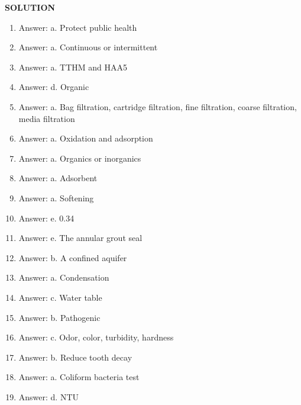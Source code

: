 \documentclass[10pt]{article}
\begin{document}
\newpage

\begin{center}
\textbf{\LARGE{SOLUTION}}
\end{center}

  \begin{enumerate}


  \item Answer: a.  Protect public health
  
  \item Answer: a.  Continuous or intermittent

  \item Answer: a.  TTHM and HAA5
  
  \item Answer: d.  Organic

  \item Answer: a.  Bag filtration, cartridge filtration, fine filtration, coarse filtration, media filtration
  
  \item Answer: a.  Oxidation and adsorption

  \item Answer: a.  Organics or inorganics
  
  \item Answer: a.  Adsorbent
  
  \item Answer: a.  Softening

  \item Answer: e.  0.34%
  
  \item Answer: e.  The annular grout seal

  \item Answer: b.  A confined aquifer

  \item Answer: a.  Condensation

  \item Answer: c.  Water table
  
  \item Answer: b.  Pathogenic
  
  \item Answer: c.  Odor, color, turbidity, hardness
  
  \item Answer: b.  Reduce tooth decay
  
  \item Answer: a.  Coliform bacteria test
  
  \item Answer: d.  NTU
  

\end{enumerate}
\end{document}
